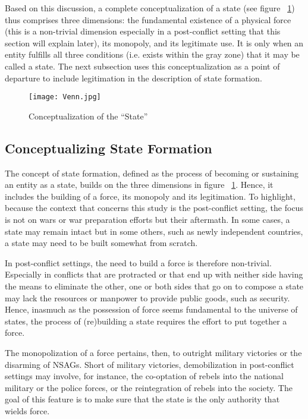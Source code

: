 \documentclass [11pt]{article}
\begin{document}
Based on this discussion, a complete conceptualization of a state (see figure ~\ref{fig1}) thus comprises three dimensions: the fundamental existence of a physical force (this is a non-trivial dimension especially in a post-conflict setting that this section will explain later), its monopoly, and its legitimate use. It is only when an entity fulfills all three conditions (i.e. exists within the gray zone) that it may be called a state. The next subsection uses this conceptualization as a point of departure to include legitimation in the description of state formation.

\begin{figure} [h!]

\caption{Conceptualization of the ``State''}
\label{fig1}%
\begin{center} 
\small
\texttt{[image: Venn.jpg]}
 
\end{center}
\end{figure}

\subsection*{Conceptualizing State Formation} %

The concept of state formation, defined as the process of becoming or sustaining an entity as a state, builds on the three dimensions in  figure ~\ref{fig1}. Hence, it includes the building of a force, its monopoly and its legitimation. To highlight, because the context that concerns this study is the post-conflict setting, the focus is not on wars or war preparation efforts but their aftermath. In some cases, a state may remain intact but in some others, such as newly independent countries, a state may need to be built somewhat from scratch.

In post-conflict settings, the need to build a force is therefore non-trivial. Especially in conflicts that are protracted or that end up with neither side having the means to eliminate the other, one or both sides that go on to compose a state may lack the resources or manpower to provide public goods, such as security. Hence, inasmuch as the possession of force seems fundamental to the universe of states, the process of (re)building a state requires the effort to put together a force.

The monopolization of a force pertains, then, to outright military victories or the disarming of NSAGs. Short of military victories, demobilization in post-conflict settings may involve, for instance, the co-optation of rebels into the national military or the police forces, or the reintegration of rebels into the society. The goal of this feature is to make sure that the state is the only authority that wields force.
\end{document}
